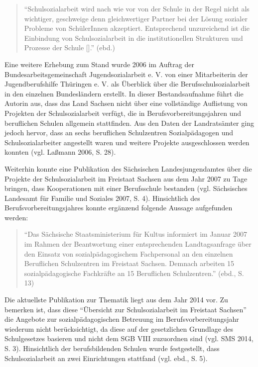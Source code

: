 {\begin{quotation}
\noindent
	"`Schulsozialarbeit wird nach wie vor von der Schule in der Regel nicht als wichtiger, geschweige denn gleichwertiger Partner bei der Lösung sozialer Probleme von SchülerInnen akzeptiert. Entsprechend unzureichend ist die Einbindung von Schulsozialarbeit in die institutionellen Strukturen und Prozesse der Schule [\punkte]."' (ebd.)
\end{quotation}

\noindent
Eine weitere Erhebung zum Stand wurde 2006 im Auftrag der Bundesarbeitsgemeinschaft Jugendsozialarbeit e. V. von einer Mitarbeiterin der Jugendberufshilfe Thüringen e. V. als Überblick über die Berufsschulsozialarbeit in den einzelnen Bundesländern erstellt. In dieser Bestandsaufnahme führt die Autorin aus, dass das Land Sachsen nicht über eine vollständige Auflistung von Projekten der Schulsozialarbeit verfügt, die in Berufsvorbereitungsjahren und beruflichen Schulen allgemein stattfinden. Aus den Daten der Landratsämter ging jedoch hervor, dass an sechs beruflichen Schulzentren Sozialpädagogen und Schulsozialarbeiter angestellt waren und weitere Projekte ausgeschlossen werden konnten (vgl. Laßmann 2006, S. 28).

Weiterhin konnte eine Publikation des Sächsischen Landesjungendamtes über die Projekte der Schulsozialarbeit im Freistaat Sachsen aus dem Jahr 2007 zu Tage bringen, dass Kooperationen mit einer Berufsschule bestanden (vgl. Sächsisches Landesamt für Familie und Soziales 2007, S. 4). Hinsichtlich des Berufsvorbereitungsjahres konnte ergänzend folgende Aussage aufgefunden werden: 

\begin{quotation}
\noindent
	"`Das Sächsische Staatsministerium für Kultus informiert im Januar 2007 im Rahmen der Beantwortung einer entsprechenden Landtagsanfrage über den Einsatz von sozialpädagogischem Fachpersonal an den einzelnen Beruflichen Schulzentren im Freistaat Sachsen. Demnach arbeiten 15 sozialpädagogische Fachkräfte an 15 Beruflichen Schulzentren."' (ebd., S. 13)
\end{quotation}

\noindent
Die aktuellste Publikation zur Thematik liegt aus dem Jahr 2014 vor. Zu bemerken ist, dass diese "`Übersicht zur Schulsozialarbeit im Freistaat Sachsen"' die Angebote zur sozialpädagogischen Betreuung im Berufsvorbereitungsjahr wiederum nicht berücksichtigt, da diese auf der gesetzlichen Grundlage des Schulgesetzes basieren und nicht dem SGB VIII zuzuordnen sind (vgl. SMS 2014, S. 3). Hinsichtlich der berufsbildenden Schulen wurde festgestellt, dass Schulsozialarbeit an zwei Einrichtungen stattfand (vgl. ebd., S. 5). 

}
